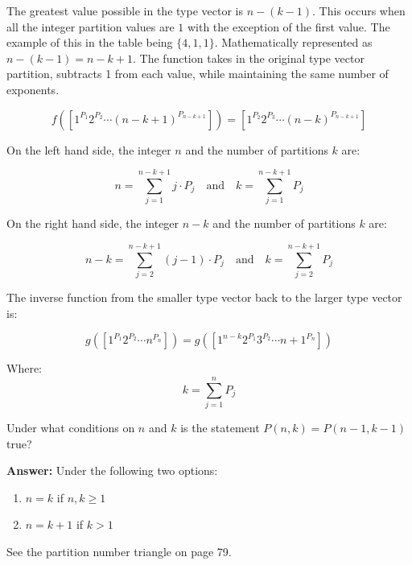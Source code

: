 \documentclass{article}
\begin{document}
The greatest value possible in the type vector is $n-(k-1)$. This occurs when all the integer partition values are $1$ with the exception of the first value. The example of this in the table being $\{4,1,1\}$. Mathematically represented as $n-(k-1) = n-k+1$. The function takes in the original type vector partition, subtracts 1 from each value, while maintaining the same number of exponents.

\begin{equation*}
f([1^{P_1}2^{P_2}\cdots (n-k+1)^{P_{n-k+1}}]) = [1^{P_2}2^{P_3}\cdots (n-k)^{P_{n-k+1}}]
\end{equation*}

On the left hand side, the integer $n$ and the number of partitions $k$ are:

\begin{equation*}
    n = \sum_{j=1}^{n-k+1} j \cdot P_j \quad \text{and} \quad k = \sum_{j=1}^{n-k+1} P_j
\end{equation*}

On the right hand side, the integer $n-k$ and the number of partitions $k$ are:

\begin{equation*}
    n-k = \sum_{j=2}^{n-k+1} (j-1) \cdot P_j \quad \text{and} \quad k = \sum_{j=2}^{n-k+1} P_j
\end{equation*}

The inverse function from the smaller type vector back to the larger type vector is:

\begin{equation*}
    g([1^{P_1}2^{P_2}\cdots n^{P_{n}}]) = g([1^{n-k}2^{P_1}3^{P_2}\cdots n+1^{P_{n}}])
\end{equation*}

Where:
\begin{equation*}
    k = \sum_{j=1}^n P_j
\end{equation*}


\setcounter{problem}{6}
\begin{problem} %
Under what conditions on $n$ and $k$ is the statement $P(n,k) = P(n-1, k-1)$ true?
\end{problem}

\textbf{Answer:} Under the following two options:
\begin{enumerate}
    \item $n=k$ if $n,k \ge 1$
    \item $n=k+1$ if $k > 1$
\end{enumerate}
See the partition number triangle on page 79.
\end{document}
